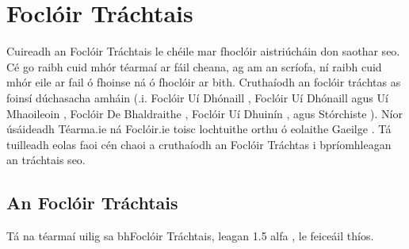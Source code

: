 \chapter{Foclóir Tráchtais} \label{appendix-focloir-trachtais}
Cuireadh an Foclóir Tráchtais le chéile mar fhoclóir aistriúcháin don saothar seo. Cé go raibh cuid mhór téarmaí ar fáil cheana, ag am an scríofa, ní raibh cuid mhór eile ar fail ó fhoinse ná ó fhoclóir ar bith. Cruthaíodh an foclóir tráchtas as foinsí dúchasacha amháin (.i. Foclóir Uí Dhónaill \cite{odonaill}, Foclóir Uí Dhónaill agus Uí Mhaoileoin \cite{focloir-beag}, Foclóir De Bhaldraithe \cite{de-bhaldraithe}, Foclóir Uí Dhuinín \cite{dineen}, agus Stórchiste \cite{storchiste}). Níor úsáideadh Téarma.ie \cite{tearmaie} ná Foclóir.ie \cite{omianain} toisc lochtuithe orthu ó eolaithe Gaeilge \cite{lang-change,diarmadose}. Tá tuilleadh eolas faoi cén chaoi a cruthaíodh an Foclóir Tráchtas i bpríomhleagan an tráchtais seo.

\section{An Foclóir Tráchtais} \label{focloir-trachtais-content}
Tá na téarmaí uilig sa bhFoclóir Tráchtais, leagan 1.5 alfa \cite{focloir-trachtais}, le feiceáil thíos.

